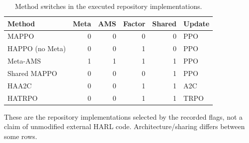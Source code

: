 \begin{table}[t]
\centering
\caption{Method switches in the executed repository implementations.}
\label{tab:methods}
\small
\setlength{\tabcolsep}{4pt}
\begin{tabular}{lrrrrl}
\toprule
Method & Meta & AMS & Factor & Shared & Update \\
\midrule
MAPPO & 0 & 0 & 0 & 0 & PPO \\
HAPPO (no Meta) & 0 & 0 & 1 & 0 & PPO \\
Meta-AMS & 1 & 1 & 1 & 1 & PPO \\
Shared MAPPO & 0 & 0 & 0 & 1 & PPO \\
HAA2C & 0 & 0 & 1 & 1 & A2C \\
HATRPO & 0 & 0 & 1 & 1 & TRPO \\
\bottomrule
\end{tabular}

\vspace{2pt}\begin{minipage}{\linewidth}\footnotesize These are the repository implementations selected by the recorded flags, not a claim of unmodified external HARL code. Architecture/sharing differs between some rows.\end{minipage}
\end{table}
